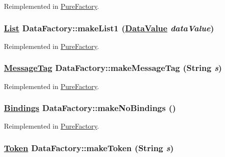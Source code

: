 Reimplemented in \hyperlink{classPureFactory_a5}{Pure\-Factory}.\hypertarget{interfaceDataFactory_a6}{
\subsubsection[makeList1]{\setlength{\rightskip}{0pt plus 5cm}\hyperlink{interfaceList}{List} Data\-Factory::make\-List1 (\hyperlink{interfaceDataValue}{Data\-Value} {\em data\-Value})}}
\label{interfaceDataFactory_a6}




Reimplemented in \hyperlink{classPureFactory_a6}{Pure\-Factory}.\hypertarget{interfaceDataFactory_a5}{
\subsubsection[makeMessageTag]{\setlength{\rightskip}{0pt plus 5cm}\hyperlink{interfaceMessageTag}{Message\-Tag} Data\-Factory::make\-Message\-Tag (String {\em s})}}
\label{interfaceDataFactory_a5}




Reimplemented in \hyperlink{classPureFactory_a4}{Pure\-Factory}.\hypertarget{interfaceDataFactory_a9}{
\subsubsection[makeNoBindings]{\setlength{\rightskip}{0pt plus 5cm}\hyperlink{interfaceBindings}{Bindings} Data\-Factory::make\-No\-Bindings ()}}
\label{interfaceDataFactory_a9}




Reimplemented in \hyperlink{classPureFactory_a7}{Pure\-Factory}.\hypertarget{interfaceDataFactory_a3}{
\subsubsection[makeToken]{\setlength{\rightskip}{0pt plus 5cm}\hyperlink{interfaceToken}{Token} Data\-Factory::make\-Token (String {\em s})}}
\label{interfaceDataFactory_a3}




